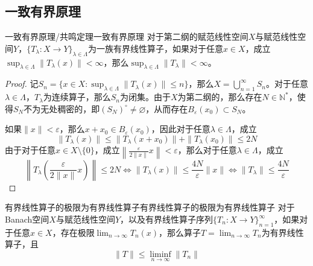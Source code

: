 \documentclass[lang = cn, scheme = chinese, thmcnt = section]{elegantbook}
\newcommand{\N}{\mathbb{N}}            %
\newcommand{\sub}{\subset}             %
\begin{document}
\subsection{一致有界原理}

\begin{theorem}{一致有界原理/共鸣定理}{一致有界原理}
	对于第二纲的赋范线性空间$X$与赋范线性空间$Y$，$\{ T_\lambda:X\to Y \}_{\lambda\in\Lambda}$为一族有界线性算子，如果对于任意$x\in X$，成立$\displaystyle \sup_{\lambda\in\Lambda}\|T_\lambda(x)\|<\infty$，那么$\displaystyle \sup_{\lambda\in\Lambda}\|T_\lambda\|<\infty$。
\end{theorem}

\begin{proof}
	记$\displaystyle S_n=\{ x\in X:\sup_{\lambda\in\Lambda}\|T_\lambda(x)\|\le n \}$，那么$\displaystyle X=\bigcup_{n=1}^{\infty}S_n$。对于任意$\lambda\in\Lambda$，$T_\lambda$为连续算子，那么$S_n$为闭集。由于$X$为第二纲的，那么存在$N\in\N^*$，使得$S_N$不为无处稠密的，即$(S_N)^\circ\ne\varnothing$，从而存在$B_\varepsilon(x_0)\sub S_N$。
	
	如果$\|x\|<\varepsilon$，那么$x+x_0\in B_\varepsilon(x_0)$，因此对于任意$\lambda\in\Lambda$，成立
	$$
	\|T_\lambda(x)\|\le \|T_\lambda(x+x_0)\|+\|T_\lambda(x_0)\|\le 2N
	$$
	由于对于任意$x\in X\setminus\{0\}$，成立$\displaystyle \left\| \frac{\varepsilon}{2\|x\|}x \right\|<\varepsilon$，那么对于任意$\lambda\in\Lambda$，成立
	$$
	\left\| T_\lambda\left( \frac{\varepsilon}{2\|x\|}x \right) \right\|\le 2N
	\iff 
	\|T_\lambda(x)\|\le\frac{4N}{\varepsilon}\|x\|
	\iff 
	\|T_\lambda\|\le\frac{4N}{\varepsilon}
	$$
\end{proof}

\begin{theorem}{有界线性算子的极限为有界线性算子}{有界线性算子的极限为有界线性算子}
	对于Banach空间$X$与赋范线性空间$Y$，以及有界线性算子序列$\{T_n:X\to Y\}_{n=1}^{\infty}$，如果对于任意$x\in X$，存在极限$\displaystyle\lim_{n\to\infty}T_n(x)$，那么算子$\displaystyle T=\lim_{n\to\infty}T_n$为有界线性算子，且
	$$
	\|T\|\le \liminf_{n\to\infty}\|T_n\|
	$$
\end{theorem}
\end{document}
